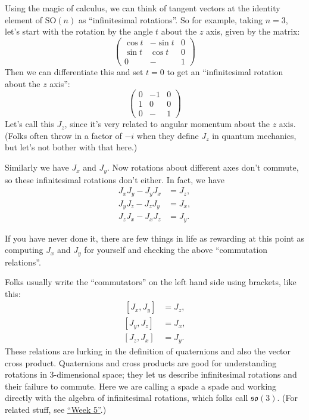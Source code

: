 \documentclass{article}
\begin{document}
Using the magic of calculus, we can think of tangent vectors at the
identity element of \(\mathrm{SO}(n)\) as ``infinitesimal rotations''.
So for example, taking \(n = 3\), let's start with the rotation by the
angle \(t\) about the \(z\) axis, given by the matrix: \[
  \left(
    \begin{array}{ccc}
      \cos t & -\sin t & 0
    \\\sin t & \cos t & 0
    \\0 & - & 1
    \end{array}
  \right)
\] Then we can differentiate this and set \(t = 0\) to get an
``infinitesimal rotation about the \(z\) axis'': \[
  \left(
    \begin{array}{ccc}
      0 & -1 & 0
    \\1 & 0 & 0
    \\0 & - & 1
    \end{array}
  \right)
\] Let's call this \(J_z\), since it's very related to angular momentum
about the \(z\) axis. (Folks often throw in a factor of \(-i\) when they
define \(J_z\) in quantum mechanics, but let's not bother with that
here.)

Similarly we have \(J_x\) and \(J_y\). Now rotations about different
axes don't commute, so these infinitesimal rotations don't either. In
fact, we have \[
  \begin{aligned}
    J_x J_y - J_y J_x &= J_z,
  \\J_y J_z - J_z J_y &= J_x,
  \\J_z J_x - J_x J_z &= J_y.
  \end{aligned}
\]

If you have never done it, there are few things in life as rewarding at
this point as computing \(J_x\) and \(J_y\) for yourself and checking
the above ``commutation relations''.

Folks usually write the ``commutators'' on the left hand side using
brackets, like this: \[
  \begin{aligned}
    \,[J_x,J_y] &= J_z,
  \\ [J_y,J_z] &= J_x,
  \\ [J_z,J_x] &= J_y.
  \end{aligned}
\] These relations are lurking in the definition of quaternions and also
the vector cross product. Quaternions and cross products are good for
understanding rotations in 3-dimensional space; they let us describe
infinitesimal rotations and their failure to commute. Here we are
calling a spade a spade and working directly with the algebra of
infinitesimal rotations, which folks call \(\mathfrak{so}(3)\). (For
related stuff, see \protect\hyperlink{week5}{``Week 5''}.)
\end{document}
